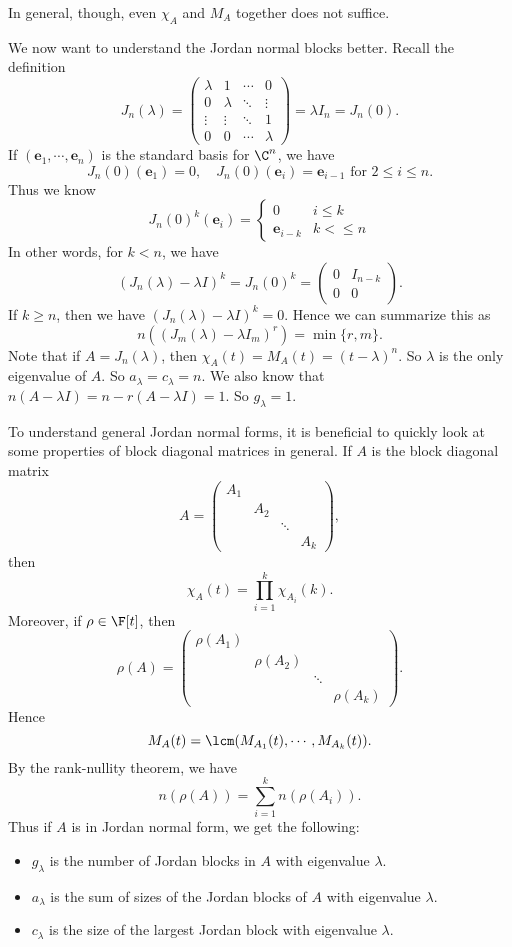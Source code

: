 \documentclass[a4paper]{article}
\begin{document}
In general, though, even $\chi_A$ and $M_A$ together does not suffice.

We now want to understand the Jordan normal blocks better. Recall the definition
\[
  J_n(\lambda) =
  \begin{pmatrix}
    \lambda & 1 & \cdots & 0\\
    0 & \lambda & \ddots & \vdots\\
    \vdots & \vdots & \ddots & 1\\
    0 & 0 & \cdots & \lambda
  \end{pmatrix} = \lambda I_n = J_n(0).
\]
If $(\mathbf{e}_1, \cdots, \mathbf{e}_n)$ is the standard basis for $\C^n$, we have
\[
  J_n(0)(\mathbf{e}_1) = 0, \quad J_n(0) (\mathbf{e}_i) = \mathbf{e}_{i - 1}\text{ for } 2\leq i \leq n.
\]
Thus we know
\[
  J_n(0)^k(\mathbf{e}_i) =
  \begin{cases}
    0 & i \leq k\\
    \mathbf{e}_{i - k} & k < \leq n
  \end{cases}
\]
In other words, for $k < n$, we have
\[
  (J_n(\lambda) - \lambda I)^k = J_n(0)^k =
  \begin{pmatrix}
    0 & I_{n - k}\\
    0 & 0
  \end{pmatrix}.
\]
If $k \geq n$, then we have $(J_n(\lambda) - \lambda I)^k = 0$.
Hence we can summarize this as
\[
  n((J_m(\lambda) - \lambda I_m)^r) = \min\{r, m\}.
\]
Note that if $A = J_n(\lambda)$, then $\chi_A(t) = M_A(t) = (t - \lambda)^n$. So $\lambda$ is the only eigenvalue of $A$. So $a_\lambda = c_\lambda = n$. We also know that $n(A - \lambda I) = n - r(A - \lambda I) = 1$. So $g_\lambda = 1$.

To understand general Jordan normal forms, it is beneficial to quickly look at some properties of block diagonal matrices in general. If $A$ is the block diagonal matrix
\[
  A =
  \begin{pmatrix}
    A_1\\
    & A_2\\
    & & \ddots\\
    & & & A_k
  \end{pmatrix},
\]
then
\[
  \chi_A(t) = \prod_{i = 1}^k \chi_{A_i}(k).
\]
Moreover, if $\rho \in \F[t]$, then
\[
  \rho (A) =
  \begin{pmatrix}
    \rho(A_1)\\
    & \rho(A_2)\\
    & & \ddots\\
    & & & \rho(A_k)
  \end{pmatrix}.
\]
Hence
\[
  M_A(t) = \lcm (M_{A_1}(t), \cdots, M_{A_k} (t)).
\]
By the rank-nullity theorem, we have
\[
  n(\rho(A)) = \sum_{i = 1}^k n(\rho(A_i)).
\]
Thus if $A$ is in Jordan normal form, we get the following:
\begin{itemize}
  \item $g_\lambda$ is the number of Jordan blocks in $A$ with eigenvalue $\lambda$.
  \item $a_\lambda$ is the sum of sizes of the Jordan blocks of $A$ with eigenvalue $\lambda$.
  \item $c_\lambda$ is the size of the largest Jordan block with eigenvalue $\lambda$.
\end{itemize}
\end{document}
